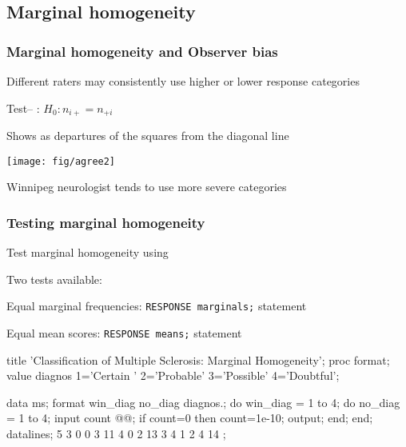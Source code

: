 


\subsection{Marginal homogeneity}
\begin{frame}
  \frametitle{Marginal homogeneity and Observer bias}
  \begin{itemize*}
	\item Different raters may consistently use higher or lower response categories
	\item Test-- : $H_0 : n_{i+} = n_{+i}$
	\item Shows as departures of the squares from the diagonal line
 \begin{center}
 \texttt{[image: fig/agree2]}
 \end{center}
 \item Winnipeg neurologist tends to use more severe categories
  \end{itemize*}
\end{frame}

\begin{frame}[fragile]
  \frametitle{Testing marginal homogeneity}
  \begin{itemize}
	\item  Test marginal homogeneity using 
      \begin{itemize*}
	  \item Two tests available:
    	\begin{itemize*}
		\item Equal marginal frequencies: \texttt{RESPONSE marginals;} statement
		\item Equal mean scores: \texttt{RESPONSE means;} statement
		\end{itemize*}
      \end{itemize*}
  \end{itemize}
\begin{Input}[fontsize=\footnotesize,label=\fbox{\texttt{agreemar.sas} $\cdots$},baselinestretch=0.8]
title 'Classification of Multiple Sclerosis: Marginal Homogeneity';
proc format;
   value diagnos 1='Certain ' 2='Probable'  3='Possible'  4='Doubtful';

data ms;
 format win_diag no_diag diagnos.;
   do win_diag = 1 to 4;
   do no_diag  = 1 to 4;
      input count @@;
      if count=0 then count=1e-10;  
      output;
      end; end;
datalines;
   5     3     0      0
   3    11     4      0
   2    13     3      4
   1     2     4     14
;
\end{Input}
\end{frame}

